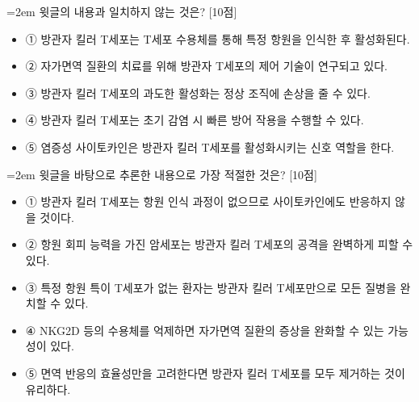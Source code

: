 \documentclass[10pt,a4paper]{article}
\newcommand{\qnum}[1]{%
  \tikz[baseline=(num.base)]{%
    \node[circle, fill=numCircle, text=white, inner sep=0pt,
          minimum size=18pt, font=\small\bfseries] (num) {#1};%
  }%
}
\newcommand{\pts}[1]{%
  \hfill\textcolor{ptsBadge}{[#1점]}%
}
\begin{document}
\begin{minipage}{\columnwidth}
{\hangindent=2em
\qnum{41}\enspace 윗글의 내용과 일치하지 않는 것은? \pts{10}
\par}

\vspace{3mm}
\begin{itemize}[leftmargin=2.5em, labelsep=0.3em, label={}, itemsep=4pt, parsep=1pt, topsep=0pt]
  \item ① 방관자 킬러 T세포는 T세포 수용체를 통해 특정 항원을 인식한 후 활성화된다.
  \item ② 자가면역 질환의 치료를 위해 방관자 T세포의 제어 기술이 연구되고 있다.
  \item ③ 방관자 킬러 T세포의 과도한 활성화는 정상 조직에 손상을 줄 수 있다.
  \item ④ 방관자 킬러 T세포는 초기 감염 시 빠른 방어 작용을 수행할 수 있다.
  \item ⑤ 염증성 사이토카인은 방관자 킬러 T세포를 활성화시키는 신호 역할을 한다.
\end{itemize}
\end{minipage}
\vspace{4mm}

\vspace{4mm}
\begin{minipage}{\columnwidth}
{\hangindent=2em
\qnum{42}\enspace 윗글을 바탕으로 추론한 내용으로 가장 적절한 것은? \pts{10}
\par}

\vspace{3mm}
\begin{itemize}[leftmargin=2.5em, labelsep=0.3em, label={}, itemsep=4pt, parsep=1pt, topsep=0pt]
  \item ① 방관자 킬러 T세포는 항원 인식 과정이 없으므로 사이토카인에도 반응하지 않을 것이다.
  \item ② 항원 회피 능력을 가진 암세포는 방관자 킬러 T세포의 공격을 완벽하게 피할 수 있다.
  \item ③ 특정 항원 특이 T세포가 없는 환자는 방관자 킬러 T세포만으로 모든 질병을 완치할 수 있다.
  \item ④ NKG2D 등의 수용체를 억제하면 자가면역 질환의 증상을 완화할 수 있는 가능성이 있다.
  \item ⑤ 면역 반응의 효율성만을 고려한다면 방관자 킬러 T세포를 모두 제거하는 것이 유리하다.
\end{itemize}
\end{minipage}
\vspace{4mm}
\end{document}
